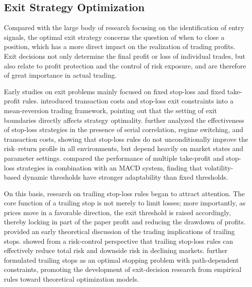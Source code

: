 \documentclass[12pt]{article}
\begin{document}
\subsection{Exit Strategy Optimization}

Compared with the large body of research focusing on the identification of entry signals, the 
optimal exit strategy concerns the question of when to close a position, which has a more 
direct impact on the realization of trading profits. Exit decisions not only determine the 
final profit or loss of individual trades, but also relate to profit protection and the control 
of risk exposure, and are therefore of great importance in actual trading.

Early studies on exit problems mainly focused on fixed stop-loss and fixed take-profit rules. 
\citet{LeungLi2015} introduced transaction costs and stop-loss exit constraints into a 
mean-reversion trading framework, pointing out that the setting of exit boundaries directly 
affects strategy optimality. \citet{LoRemorov2017} further analyzed the effectiveness of 
stop-loss strategies in the presence of serial correlation, regime switching, and transaction 
costs, showing that stop-loss rules do not unconditionally improve the risk--return profile in 
all environments, but depend heavily on market states and parameter settings. 
\citet{VezerisKyrgosSchinas2018} compared the performance of multiple take-profit and stop-loss 
strategies in combination with an MACD system, finding that volatility-based dynamic 
thresholds have stronger adaptability than fixed thresholds.

On this basis, research on trailing stop-loss rules began to attract attention. The core 
function of a trailing stop is not merely to limit losses; more importantly, as prices move in 
a favorable direction, the exit threshold is raised accordingly, thereby locking in part of the 
paper profit and reducing the drawdown of profits. \citet{GlynnIglehart1995} provided an early 
theoretical discussion of the trading implications of trailing stops. \citet{DaiEtAl2021} 
showed from a risk-control perspective that trailing stop-loss rules can effectively reduce 
total risk and downside risk in declining markets. \citet{LeungZhang2021} further formulated 
trailing stops as an optimal stopping problem with path-dependent constraints, promoting the 
development of exit-decision research from empirical rules toward theoretical optimization 
models.
\end{document}
